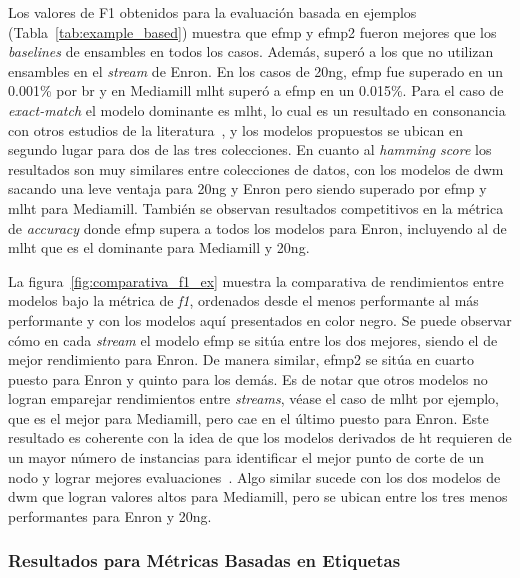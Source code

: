Los valores de F1 obtenidos para la evaluación basada en ejemplos
(Tabla~\ref{tab:example_based}) muestra que \acrshort{efmp} y \acrshort{efmp2}
fueron mejores que los \textit{baselines} de ensambles en todos los casos.
Además, superó a los que no utilizan ensambles en el \textit{stream} de Enron.
En los casos de 20ng, \acrshort{efmp} fue superado en un 0.001\% por
\acrshort{br} y en Mediamill \acrshort{mlht} superó a \acrshort{efmp} en un
0.015\%. Para el caso de \textit{exact-match} el modelo dominante es
\acrshort{mlht}, lo cual es un resultado en consonancia con otros estudios de la
literatura~\cite{read_scalable_2012,osojnik_multi-label_2017,zheng_survey_2020},
y los modelos propuestos se ubican en segundo lugar para dos de las tres
colecciones. En cuanto al \textit{hamming score} los resultados son muy
similares entre colecciones de datos, con los modelos de \acrshort{dwm} sacando
una leve ventaja para 20ng y Enron pero siendo superado por \acrshort{efmp} y
\acrshort{mlht} para Mediamill. También se observan resultados competitivos en
la métrica de \textit{accuracy} donde \acrshort{efmp} supera a todos los modelos
para Enron, incluyendo al de \acrshort{mlht} que es el dominante para Mediamill
y 20ng.

La figura~\ref{fig:comparativa_f1_ex} muestra la comparativa de rendimientos
entre modelos bajo la métrica de \textit{f1}, ordenados desde el menos
performante al más performante y con los modelos aquí presentados en color
negro. Se puede observar cómo en cada \textit{stream} el modelo \acrshort{efmp}
se sitúa entre los dos mejores, siendo el de mejor rendimiento para Enron. De
manera similar, \acrshort{efmp2} se sitúa en cuarto puesto para Enron y quinto
para los demás. Es de notar que otros modelos no logran emparejar rendimientos
entre \textit{streams}, véase el caso de \acrshort{mlht} por ejemplo, que es el
mejor para Mediamill, pero cae en el último puesto para Enron. Este resultado es
coherente con la idea de que los modelos derivados de \acrlong{ht} requieren de
un mayor número de instancias para identificar el mejor punto de corte de un
nodo y lograr mejores evaluaciones~\cite{read_scalable_2012}. Algo similar
sucede con los dos modelos de \acrshort{dwm} que logran valores altos para
Mediamill, pero se ubican entre los tres menos performantes para Enron y 20ng.

\subsubsection{Resultados para Métricas Basadas en Etiquetas}

